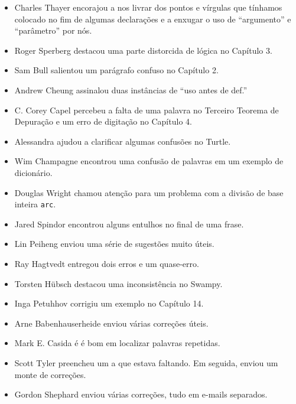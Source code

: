 \documentclass[10pt]{book}
\begin{document}
\begin {itemize}
\item Charles Thayer encorajou a nos livrar dos pontos e vírgulas
que tínhamos colocado no fim de algumas declarações e a enxugar o
uso de ``argumento'' e ``parâmetro'' por nós.

\item Roger Sperberg destacou uma parte distorcida de lógica no Capítulo 3.

\item Sam Bull salientou um parágrafo confuso no Capítulo 2.

\item Andrew Cheung assinalou duas instâncias de ``uso antes de def.''

\item C. Corey Capel percebeu a falta de uma palavra no Terceiro Teorema
de Depuração e um erro de digitação no Capítulo 4.

\item Alessandra ajudou a clarificar algumas confusões no Turtle.

\item Wim Champagne encontrou uma confusão de palavras em um exemplo de dicionário.

\item Douglas Wright chamou atenção para um problema com a divisão de base inteira
{\tt arc}.

\item Jared Spindor encontrou alguns entulhos no final de uma frase.

\item Lin Peiheng enviou uma série de sugestões muito úteis.

\item Ray Hagtvedt entregou dois erros e um quase-erro.

\item Torsten H\"{u}bsch destacou uma inconsistência no Swampy.

\item Inga Petuhhov corrigiu um exemplo no Capítulo 14.

\item Arne Babenhauserheide enviou várias correções úteis.

\item Mark E. Casida é é bom em localizar palavras repetidas.

\item Scott Tyler preencheu um a que estava faltando. Em seguida, enviou
um monte de correções.

\item Gordon Shephard enviou várias correções, tudo em e-mails
separados.


\end{itemize}
\end{document}
